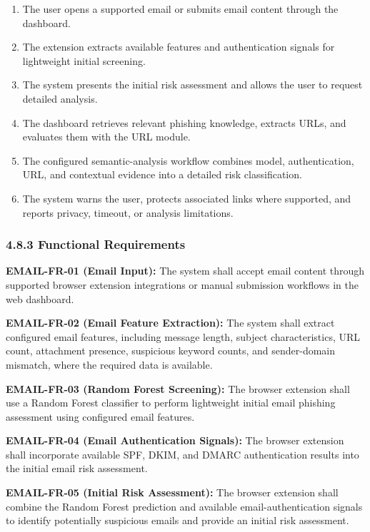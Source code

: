 \documentclass[12pt,a4paper]{report}
\begin{document}
\begin{enumerate}
\item The user opens a supported email or submits email content through the dashboard.
\item The extension extracts available features and authentication signals for lightweight initial screening.
\item The system presents the initial risk assessment and allows the user to request detailed analysis.
\item The dashboard retrieves relevant phishing knowledge, extracts URLs, and evaluates them with the URL module.
\item The configured semantic-analysis workflow combines model, authentication, URL, and contextual evidence into a detailed risk classification.
\item The system warns the user, protects associated links where supported, and reports privacy, timeout, or analysis limitations.
\end{enumerate}

\subsubsection*{4.8.3 Functional Requirements}

\textbf{EMAIL-FR-01 (Email Input):} The system shall accept email content through supported browser extension integrations or manual submission workflows in the web dashboard.\par

\textbf{EMAIL-FR-02 (Email Feature Extraction):} The system shall extract configured email features, including message length, subject characteristics, URL count, attachment presence, suspicious keyword counts, and sender-domain mismatch, where the required data is available.\par

\textbf{EMAIL-FR-03 (Random Forest Screening):} The browser extension shall use a Random Forest classifier to perform lightweight initial email phishing assessment using configured email features.\par

\textbf{EMAIL-FR-04 (Email Authentication Signals):} The browser extension shall incorporate available SPF, DKIM, and DMARC authentication results into the initial email risk assessment.\par

\textbf{EMAIL-FR-05 (Initial Risk Assessment):} The browser extension shall combine the Random Forest prediction and available email-authentication signals to identify potentially suspicious emails and provide an initial risk assessment.\par
\end{document}
